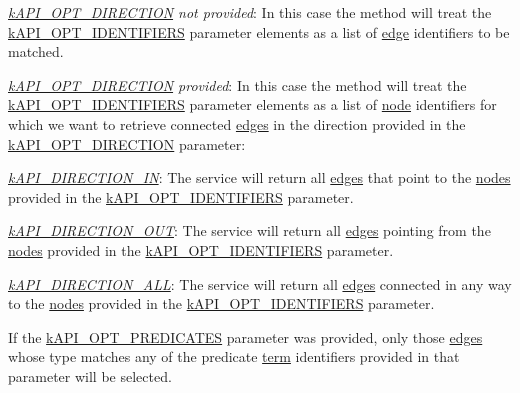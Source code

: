 \begin{DoxyItemize}
\item {\itshape \hyperlink{}{k\-A\-P\-I\-\_\-\-O\-P\-T\-\_\-\-D\-I\-R\-E\-C\-T\-I\-O\-N} not provided}\-: In this case the method will treat the \hyperlink{}{k\-A\-P\-I\-\_\-\-O\-P\-T\-\_\-\-I\-D\-E\-N\-T\-I\-F\-I\-E\-R\-S} parameter elements as a list of \hyperlink{class_c_ontology_edge}{edge} identifiers to be matched. 
\item {\itshape \hyperlink{}{k\-A\-P\-I\-\_\-\-O\-P\-T\-\_\-\-D\-I\-R\-E\-C\-T\-I\-O\-N} provided}\-: In this case the method will treat the \hyperlink{}{k\-A\-P\-I\-\_\-\-O\-P\-T\-\_\-\-I\-D\-E\-N\-T\-I\-F\-I\-E\-R\-S} parameter elements as a list of \hyperlink{class_c_ontology_node}{node} identifiers for which we want to retrieve connected \hyperlink{class_c_ontology_edge}{edges} in the direction provided in the \hyperlink{}{k\-A\-P\-I\-\_\-\-O\-P\-T\-\_\-\-D\-I\-R\-E\-C\-T\-I\-O\-N} parameter\-: 
\begin{DoxyItemize}
\item {\itshape \hyperlink{}{k\-A\-P\-I\-\_\-\-D\-I\-R\-E\-C\-T\-I\-O\-N\-\_\-\-I\-N}}\-: The service will return all \hyperlink{class_c_ontology_edge}{edges} that point to the \hyperlink{class_c_ontology_node}{nodes} provided in the \hyperlink{}{k\-A\-P\-I\-\_\-\-O\-P\-T\-\_\-\-I\-D\-E\-N\-T\-I\-F\-I\-E\-R\-S} parameter. 
\item {\itshape \hyperlink{}{k\-A\-P\-I\-\_\-\-D\-I\-R\-E\-C\-T\-I\-O\-N\-\_\-\-O\-U\-T}}\-: The service will return all \hyperlink{class_c_ontology_edge}{edges} pointing from the \hyperlink{class_c_ontology_node}{nodes} provided in the \hyperlink{}{k\-A\-P\-I\-\_\-\-O\-P\-T\-\_\-\-I\-D\-E\-N\-T\-I\-F\-I\-E\-R\-S} parameter. 
\item {\itshape \hyperlink{}{k\-A\-P\-I\-\_\-\-D\-I\-R\-E\-C\-T\-I\-O\-N\-\_\-\-A\-L\-L}}\-: The service will return all \hyperlink{class_c_ontology_edge}{edges} connected in any way to the \hyperlink{class_c_ontology_node}{nodes} provided in the \hyperlink{}{k\-A\-P\-I\-\_\-\-O\-P\-T\-\_\-\-I\-D\-E\-N\-T\-I\-F\-I\-E\-R\-S} parameter. 
\end{DoxyItemize}
\end{DoxyItemize}

If the \hyperlink{}{k\-A\-P\-I\-\_\-\-O\-P\-T\-\_\-\-P\-R\-E\-D\-I\-C\-A\-T\-E\-S} parameter was provided, only those \hyperlink{class_c_ontology_edge}{edges} whose type matches any of the predicate \hyperlink{class_c_ontology_term}{term} identifiers provided in that parameter will be selected.

